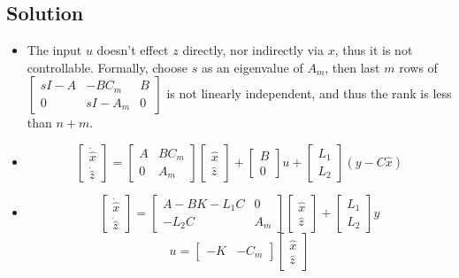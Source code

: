 \documentclass[11pt]{report}
\begin{document}

\subsection*{Solution}
\begin{itemize}
\item The input $u$ doesn't effect $z$ directly, nor indirectly via $x$, thus it is not controllable. Formally, choose $s$ as an eigenvalue of $A_m$, then last $m$ rows of $\begin{bmatrix} sI-A & -BC_m & B\\0 & sI-A_m & 0 \end{bmatrix}$ is not linearly independent, and thus the rank is less than $n+m$.
\item $$\begin{bmatrix} \dot{\hat{x}}\\ \dot{\hat{z}} \end{bmatrix} = \begin{bmatrix} A & BC_m \\0 & A_m \end{bmatrix} \begin{bmatrix} \hat{x}\\ \hat{z} \end{bmatrix} + \begin{bmatrix} B\\ 0 \end{bmatrix}u + \begin{bmatrix} L_1\\ L_2 \end{bmatrix} (y - C\hat{x})$$
\item $$\begin{bmatrix} \dot{\hat{x}}\\ \dot{\hat{z}} \end{bmatrix} = \begin{bmatrix} A-BK-L_1C & 0 \\-L_2C & A_m \end{bmatrix} \begin{bmatrix} \hat{x}\\ \hat{z} \end{bmatrix} + \begin{bmatrix} L_1\\ L_2 \end{bmatrix} y$$
$$u = \begin{bmatrix} -K & -C_m \end{bmatrix} \begin{bmatrix} \hat{x}\\ \hat{z} \end{bmatrix}$$

\end{itemize}
\end{document}
